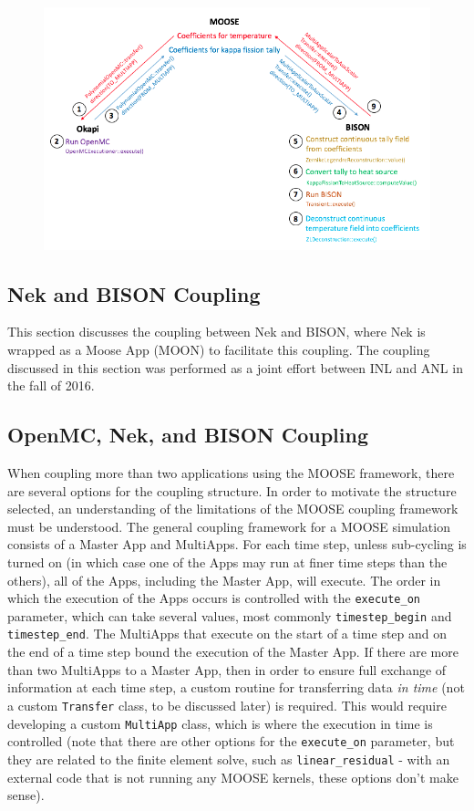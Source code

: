\documentclass[10pt]{article}
\numberwithin{equation}{section} %
\begin{document}
\begin{figure}[H]
\centering
\includegraphics[width=15cm]{figures/OpenMC-BISON-complicated.png}
\end{figure}

\subsection{Nek and BISON Coupling}
This section discusses the coupling between Nek and BISON, where Nek is wrapped as a Moose App (MOON) to facilitate this coupling. The coupling discussed in this section was performed as a joint effort between INL and ANL in the fall of 2016.

\subsection{OpenMC, Nek, and BISON Coupling}
When coupling more than two applications using the MOOSE framework, there are several options for the coupling structure. In order to motivate the structure selected, an understanding of the limitations of the MOOSE coupling framework must be understood. The general coupling framework for a MOOSE simulation consists of a Master App and MultiApps. For each time step, unless sub-cycling is turned on (in which case one of the Apps may run at finer time steps than the others), all of the Apps, including the Master App, will execute. The order in which the execution of the Apps occurs is controlled with the {\tt execute\_on} parameter, which can take several values, most commonly {\tt timestep\_begin} and {\tt timestep\_end}. The MultiApps that execute on the start of a time step and on the end of a time step bound the execution of the Master App. If there are more than two MultiApps to a Master App, then in order to ensure full exchange of information at each time step, a custom routine for transferring data {\it in time} (not a custom {\tt Transfer} class, to be discussed later) is required. This would require developing a custom {\tt MultiApp} class, which is where the execution in time is controlled (note that there are other options for the {\tt execute\_on} parameter, but they are related to the finite element solve, such as {\tt linear\_residual} - with an external code that is not running any MOOSE kernels, these options don't make sense).
\end{document}
